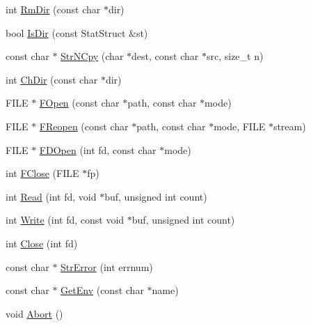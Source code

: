 \begin{DoxyCompactItemize}
\item 
int \hyperlink{namespacetesting_1_1internal_1_1posix_ab1b01a6ad8be63acf95b6ab74b517ec3}{\-Rm\-Dir} (const char $\ast$dir)
\item 
bool \hyperlink{namespacetesting_1_1internal_1_1posix_abee7434e7bcb311fff367f690e97cfcd}{\-Is\-Dir} (const \-Stat\-Struct \&st)
\item 
const char $\ast$ \hyperlink{namespacetesting_1_1internal_1_1posix_a261b7136efb272312daa5c1f82e88c79}{\-Str\-N\-Cpy} (char $\ast$dest, const char $\ast$src, size\-\_\-t n)
\item 
int \hyperlink{namespacetesting_1_1internal_1_1posix_a99a868de1d5ace7a494124cabfe5f119}{\-Ch\-Dir} (const char $\ast$dir)
\item 
\-F\-I\-L\-E $\ast$ \hyperlink{namespacetesting_1_1internal_1_1posix_a71d8d763c7a5feba8bbb9a65fdc4cc87}{\-F\-Open} (const char $\ast$path, const char $\ast$mode)
\item 
\-F\-I\-L\-E $\ast$ \hyperlink{namespacetesting_1_1internal_1_1posix_a97431e0bfd874f9d198aff7807139e36}{\-F\-Reopen} (const char $\ast$path, const char $\ast$mode, \-F\-I\-L\-E $\ast$stream)
\item 
\-F\-I\-L\-E $\ast$ \hyperlink{namespacetesting_1_1internal_1_1posix_a91847cc22a69779893a4eda11daeabdc}{\-F\-D\-Open} (int fd, const char $\ast$mode)
\item 
int \hyperlink{namespacetesting_1_1internal_1_1posix_a69185e213a0e903723d28fe4db39e5ae}{\-F\-Close} (\-F\-I\-L\-E $\ast$fp)
\item 
int \hyperlink{namespacetesting_1_1internal_1_1posix_a6c02983bd73d8083cd46e47b7cd114f1}{\-Read} (int fd, void $\ast$buf, unsigned int count)
\item 
int \hyperlink{namespacetesting_1_1internal_1_1posix_a9bb8588c4b70daa75e2507d8c845e224}{\-Write} (int fd, const void $\ast$buf, unsigned int count)
\item 
int \hyperlink{namespacetesting_1_1internal_1_1posix_a6f8ed9be61fa28cc4bcf197d99d3e898}{\-Close} (int fd)
\item 
const char $\ast$ \hyperlink{namespacetesting_1_1internal_1_1posix_a63c0c6ba1a8123ba43417a7199250f15}{\-Str\-Error} (int errnum)
\item 
const char $\ast$ \hyperlink{namespacetesting_1_1internal_1_1posix_a7ed11bcd211f76641b16e60b5f0594eb}{\-Get\-Env} (const char $\ast$name)
\item 
void \hyperlink{namespacetesting_1_1internal_1_1posix_a12b9283f52eaf7610afe4b04fbca2ff0}{\-Abort} ()
\item 

\end{DoxyCompactItemize}
